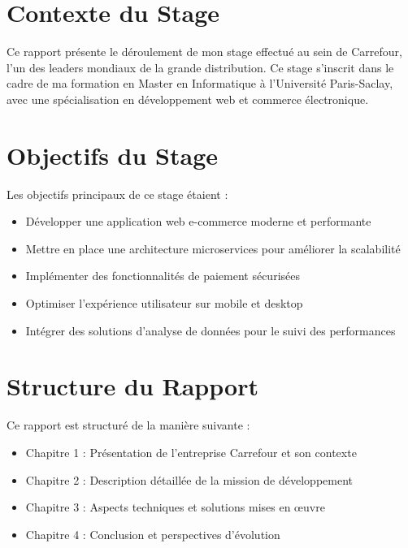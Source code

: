 \section{Contexte du Stage}
Ce rapport présente le déroulement de mon stage effectué au sein de Carrefour, l'un des leaders mondiaux de la grande distribution. Ce stage s'inscrit dans le cadre de ma formation en Master en Informatique à l'Université Paris-Saclay, avec une spécialisation en développement web et commerce électronique.

\section{Objectifs du Stage}
Les objectifs principaux de ce stage étaient :
\begin{itemize}
    \item Développer une application web e-commerce moderne et performante
    \item Mettre en place une architecture microservices pour améliorer la scalabilité
    \item Implémenter des fonctionnalités de paiement sécurisées
    \item Optimiser l'expérience utilisateur sur mobile et desktop
    \item Intégrer des solutions d'analyse de données pour le suivi des performances
\end{itemize}

\section{Structure du Rapport}
Ce rapport est structuré de la manière suivante :
\begin{itemize}
    \item Chapitre 1 : Présentation de l'entreprise Carrefour et son contexte
    \item Chapitre 2 : Description détaillée de la mission de développement
    \item Chapitre 3 : Aspects techniques et solutions mises en œuvre
    \item Chapitre 4 : Conclusion et perspectives d'évolution
\end{itemize} 